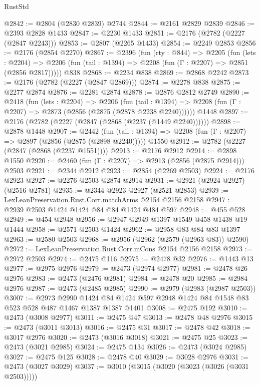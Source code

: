 \begin{lexlean}{RustStd}
\begin{coremodule}
{\begin{coremodule}
{{{{{{{{{{@2842 := @2804 (@2830 @2839) @2744
@2844 := @2161 @2829 @2839
@2846 := @2393 @2828 @1433
@2847 := @2230 @1433
@2851 := @2176 (@2782 (@2227 (@2847 @2243)))
@2853 := @2807 (@2265 @1433)
@2854 := @2249 @2853
@2856 := @2176 (@2854 @2270)
@2867 := @2396
    (fun (rty : @844) =>
    @2205
      (fun (lets : @2204) =>
      @2206 (fun (tail : @1394) => @2208 (fun (Γ : @2207) => @2851 (@2856 @2817)))))
    @838
@2868 := @2234 @838
@2869 := @2868 @2242
@2873 := @2176 (@2782 (@2227 (@2847 @2869)))
@2874 := @2278 @838
@2875 := @2277 @2874
@2876 := @2281 @2874
@2878 := @2876 @2812 @2749
@2890 := @2418
    (fun (lets : @2204) =>
    @2206
      (fun (tail : @1394) => @2208 (fun (Γ : @2207) => @2873 (@2856 (@2875 (@2878 @2238 @2240))))))
    @1448
@2897 := @2176 (@2782 (@2227 (@2847 (@2868 (@2237 (@1449 @2240))))))
@2898 := @2878 @1448
@2907 := @2442
    (fun (tail : @1394) => @2208 (fun (Γ : @2207) => @2897 (@2856 (@2875 (@2898 @2240)))))
    @1550
@2912 := @2782 (@2227 (@2847 (@2868 (@2237 @1551))))
@2913 := @2176 @2912
@2914 := @2898 @1550
@2920 := @2460 (fun (Γ : @2207) => @2913 (@2856 (@2875 @2914))) @2503
@2921 := @2344 @2912
@2923 := @2854 (@2269 @2503)
@2924 := @2176 @2923
@2927 := @2276 @2503 @2874 @2914
@2931 := @2921 (@2924 @2927) (@2516 @2781)
@2935 := @2344 @2923 @2927 (@2521 @2853)
@2939 := LexLeanPreservation.Rust.Corr.matchArms @2154 @2156 @2158
@2947 := @2939 @2503 @1424 @1424 @84 @84 @1424 @484 @597
@2948 := @455 @528
@2949 := @454 @2948
@2956 := @2947 @2949 @1397 @1549 @458 @1438 @19 @1444
@2958 := @2571 @2503 @1424
@2962 := @2958 @83 @84 @83 @1397
@2963 := @2580 @2503
@2968 := @2956 (@2962 (@2579 (@2963 @83)) @2590)
@2972 := LexLeanPreservation.Rust.Corr.mCons @2154 @2156 @2158
@2973 := @2972 @2503
@2974 := @2475 @116
@2975 := @2478 @32
@2976 := @1443 @13
@2977 := @2975 @2976
@2979 := @2473 (@2974 @2977)
@2981 := @2478 @26 @2976
@2983 := @2473 (@2476 @2981)
@2984 := @2478 @20
@2985 := @2984 @2976
@2987 := @2473 (@2485 @2985)
@2990 := @2979 (@2983 (@2987 @2503))
@3007 := @2973
    @2990
    @1424
    @84
    @1424
    @597
    @2948
    @1424
    @84
    @1548
    @83
    @523
    @528
    @487
    @1467
    @1387
    @1387
    @1401
@3008 := @2475 @192
@3010 := @2473 (@3008 @2977)
@3011 := @2475 @47
@3013 := @2478 @48 @2976
@3015 := @2473 (@3011 @3013)
@3016 := @2475 @31
@3017 := @2478 @42
@3018 := @3017 @2976
@3020 := @2473 (@3016 @3018)
@3021 := @2475 @25
@3023 := @2473 (@3021 @2985)
@3024 := @2475 @134
@3026 := @2473 (@3024 @2985)
@3027 := @2475 @125
@3028 := @2478 @40
@3029 := @3028 @2976
@3031 := @2473 (@3027 @3029)
@3037 := @3010 (@3015 (@3020 (@3023 (@3026 (@3031 @2503)))))
}}}}}}}}}}
\end{coremodule}}
\end{coremodule}
\end{lexlean}
